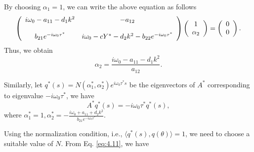 \documentclass[10pt]{amsart}
\theoremstyle{definition}
\begin{document}
By choosing $\alpha_1=1$, we can write the above equation as follows
\begin{align}\label{eq:4.10}
\left(
\begin{array}{cc}
   {i\omega_0 -a_{11}-d_1k^2} & {-a_{12}}\\ \\
   {\-b_{21}e^{-i\omega_0 \tau^*}} & {i\omega_0-cY^*-d_2k^2-b_{22}e^{-i\omega_0 \tau^*}}\\
  \end{array}
  \right)
  \left(
  \begin{array}{c}
  {\displaystyle{1}}\\
  {\displaystyle{\alpha_2}}\\
  \end{array}
  \right)=\left(
  \begin{array}{c}
  {\displaystyle{0}}\\
  {\displaystyle{0}}\\
  \end{array}
  \right).
  \end{align}
Thus, we obtain
$$\alpha_2=\frac{i\omega_0-a_{11}-d_1k^2}{a_{12}}.$$

Similarly, let $q^*(s)=N(\alpha_{1}^*,\alpha_{2}^*)e^{i\omega_{0}\tau^{*}s}$ be the eigenvectors
of $A^*$ corresponding to eigenvalue $-i\omega_{0}\tau^{*}$, we have
\begin{equation}\label{eq:4.11}
A^*q^*(s)=-i\omega_{0}\tau^{*}q^*(s),
\end{equation}
where $\alpha_{1}^*=1,\alpha_{2}^*=-\frac{i\omega_0+a_{11}+d_2k^2}{b_{21} e^{-i\omega_0 \tau^*}} $.

Using the normalization condition, i.e., $\langle q^*(s),q(\theta)\rangle=1$, we need to choose a suitable value of $N$.
From Eq. \eqref{eq:4.11}, we have
\end{document}
